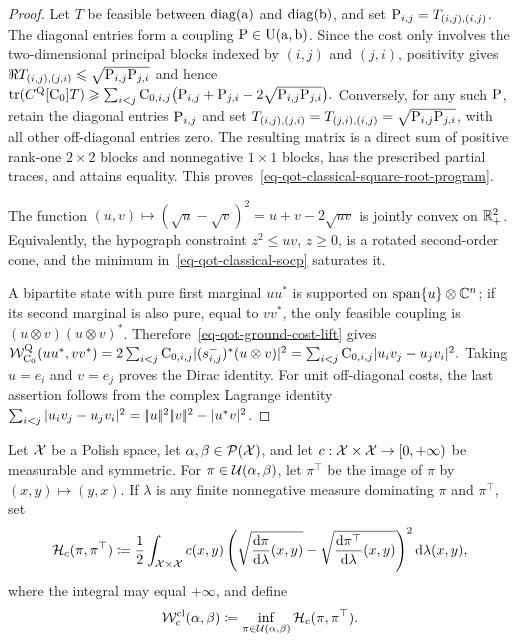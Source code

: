 \begin{proof}
Let $T$ be feasible between $\diag(\a)$ and $\diag(\b)$, and set $\P_{i,j}=T_{(i,j),(i,j)}$. The diagonal entries form a coupling $\P\in\CouplingsD(\a,\b)$. Since the cost only involves the two-dimensional principal blocks indexed by $(i,j)$ and $(j,i)$, positivity gives
$\Re T_{(i,j),(j,i)}\leq\sqrt{\P_{i,j}\P_{j,i}}$ and hence
\(\tr(C^{\mathrm Q}[\C_0]T) \geq \sum_{i<j}\C_{0,i,j} \bigl(\P_{i,j}+\P_{j,i}-2\sqrt{\P_{i,j}\P_{j,i}}\bigr).\)
Conversely, for any such $\P$, retain the diagonal entries $\P_{i,j}$ and set
$T_{(i,j),(j,i)}=T_{(j,i),(i,j)}=\sqrt{\P_{i,j}\P_{j,i}}$, with all other off-diagonal entries zero. The resulting matrix is a direct sum of positive rank-one $2\times2$ blocks and nonnegative $1\times1$ blocks, has the prescribed partial traces, and attains equality. This proves~\eqref{eq-qot-classical-square-root-program}.

The function $(u,v)\mapsto(\sqrt u-\sqrt v)^2=u+v-2\sqrt{uv}$ is jointly convex on $\RR_+^2$. Equivalently, the hypograph constraint $z^2\leq uv$, $z\geq0$, is a rotated second-order cone, and the minimum in~\eqref{eq-qot-classical-socp} saturates it.

A bipartite state with pure first marginal $uu^*$ is supported on $\operatorname{span}\{u\}\otimes\CC^n$; if its second marginal is also pure, equal to $vv^*$, the only feasible coupling is $(u\otimes v)(u\otimes v)^*$. Therefore~\eqref{eq-qot-ground-cost-lift} gives
\(\mathcal W_{\C_0}^{\mathrm Q}(uu^*,vv^*) =2\sum_{i<j}\C_{0,i,j}|(s_{i,j}^-)^*(u\otimes v)|^2 =\sum_{i<j}\C_{0,i,j}|u_i v_j-u_j v_i|^2.\)
Taking $u=e_i$ and $v=e_j$ proves the Dirac identity. For unit off-diagonal costs, the last assertion follows from the complex Lagrange identity
$\sum_{i<j}|u_i v_j-u_j v_i|^2=\norm{u}^2\norm{v}^2-|u^*v|^2$.
\end{proof}
\begin{defn}\label{def-classical-square-root-transport}
Let $\Xx$ be a Polish space, let $\alpha,\beta\in\Pp(\Xx)$, and let $c:\Xx\times\Xx\to[0,+\infty)$ be measurable and symmetric. For $\pi\in\Couplings(\alpha,\beta)$, let $\pi^\top$ be the image of $\pi$ by $(x,y)\mapsto(y,x)$. If $\lambda$ is any finite nonnegative measure dominating $\pi$ and $\pi^\top$, set
\begin{equation}\label{eq-classical-square-root-action}
\mathscr H_c(\pi,\pi^\top)
\eqdef
\frac12\int_{\Xx\times\Xx}c(x,y)
\left(
\sqrt{\frac{\d\pi}{\d\lambda}(x,y)}
-
\sqrt{\frac{\d\pi^\top}{\d\lambda}(x,y)}
\right)^2\d\lambda(x,y),
\end{equation}
where the integral may equal $+\infty$, and define
\begin{equation}\label{eq-classical-square-root-transport}
\mathcal W_c^{\mathrm{cl}}(\alpha,\beta)
\eqdef
\inf_{\pi\in\Couplings(\alpha,\beta)}\mathscr H_c(\pi,\pi^\top).
\end{equation}
\end{defn}
